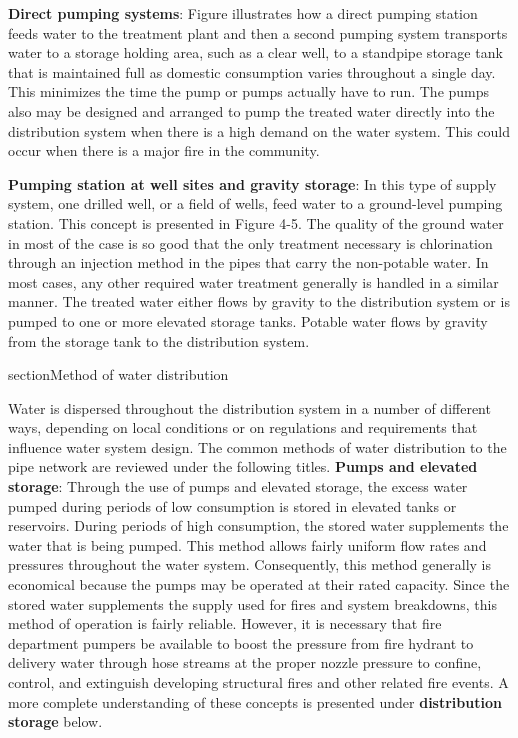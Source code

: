 \textbf{Direct pumping systems}: Figure illustrates how a direct pumping station feeds water to the 
treatment plant and then a second pumping system transports water to a storage holding area, 
such as a clear well, to a standpipe storage tank that is maintained full as domestic consumption
varies throughout a single day. This minimizes the time the pump or pumps actually have to run. 
The pumps also may be designed and arranged to pump the treated water directly into the 
distribution system when there is a high demand on the water system. This could occur when 
there is a major fire in the community.



\begin{figure}
    
\end{figure}

\textbf{Pumping station at well sites and gravity storage}: In this type of supply system, one drilled
well, or a field of wells, feed water to a ground-level pumping station. This concept is
presented in Figure 4-5. The quality of the ground water in most of the case is so good that 
the only treatment necessary is chlorination through an injection method in the pipes that 
carry the non-potable water. In most cases, any other required water treatment generally is 
handled in a similar manner. The treated water either flows by gravity to the distribution 
system or is pumped to one or more elevated storage tanks. Potable water flows by gravity from 
the storage tank to the distribution system.


\begin{figure}
    
\end{figure}

section{Method of water distribution}

Water is dispersed throughout the distribution system in a number of different ways, depending 
on local conditions or on regulations and requirements that influence water system design. 
The common methods of water distribution to the pipe network are reviewed under the following 
titles.
\bigbreak
\textbf{Pumps and elevated storage}: Through the use of pumps and elevated storage, the excess water pumped
during periods of low consumption is stored in elevated tanks or reservoirs. During periods of 
high consumption, the stored water supplements the water that is being pumped. This method allows
fairly uniform flow rates and pressures throughout the water system. Consequently, this method 
generally is economical because the pumps may be operated at their rated capacity. Since the 
stored water supplements the supply used for fires and system breakdowns, this method of operation
is fairly reliable. However, it is necessary that fire department pumpers be available to boost 
the pressure from fire hydrant to delivery water through hose streams at the proper nozzle 
pressure to confine, control, and extinguish developing structural fires and other related fire
events. A more complete understanding of these concepts is presented under \textbf{distribution storage}
below.

